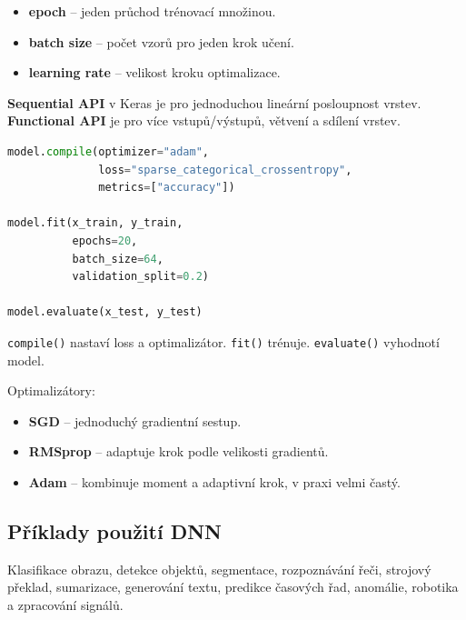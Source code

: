 \begin{itemize}
    \item \textbf{epoch} -- jeden průchod trénovací množinou.
    \item \textbf{batch size} -- počet vzorů pro jeden krok učení.
    \item \textbf{learning rate} -- velikost kroku optimalizace.
\end{itemize}

\textbf{Sequential API} v Keras je pro jednoduchou lineární posloupnost vrstev. \textbf{Functional API} je pro více vstupů/výstupů, větvení a sdílení vrstev.

\begin{lstlisting}[language=Python]
model.compile(optimizer="adam",
              loss="sparse_categorical_crossentropy",
              metrics=["accuracy"])

model.fit(x_train, y_train,
          epochs=20,
          batch_size=64,
          validation_split=0.2)

model.evaluate(x_test, y_test)
\end{lstlisting}

\texttt{compile()} nastaví loss a optimalizátor. \texttt{fit()} trénuje. \texttt{evaluate()} vyhodnotí model.

Optimalizátory:
\begin{itemize}
    \item \textbf{SGD} -- jednoduchý gradientní sestup.
    \item \textbf{RMSprop} -- adaptuje krok podle velikosti gradientů.
    \item \textbf{Adam} -- kombinuje moment a adaptivní krok, v praxi velmi častý.
\end{itemize}

\subsection*{Příklady použití DNN}
Klasifikace obrazu, detekce objektů, segmentace, rozpoznávání řeči, strojový
překlad, sumarizace, generování textu, predikce časových řad, anomálie,
robotika a zpracování signálů.

